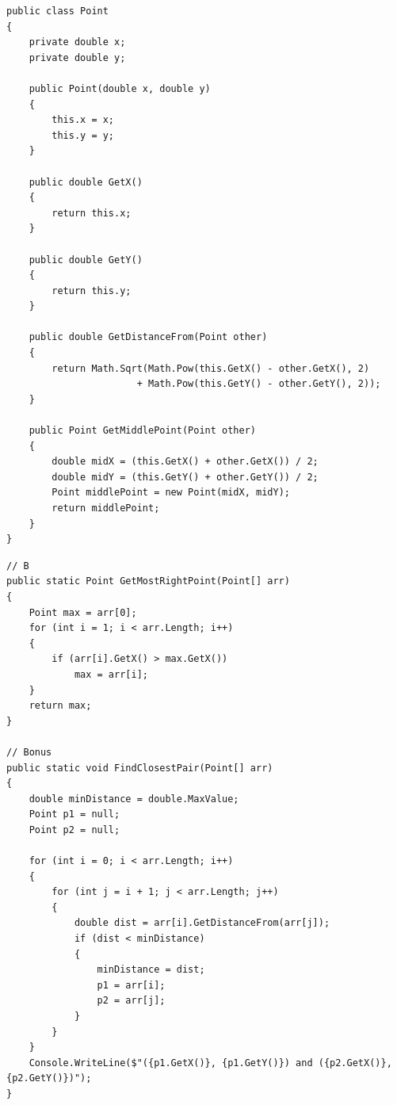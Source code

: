 \documentclass[14pt]{extarticle}
\begin{document}
\ifwithsols
{\small
\begin{boxSolution}[فرع أ]
\begin{english}
\begin{verbatim}
public class Point
{
    private double x;
    private double y;

    public Point(double x, double y)
    {
        this.x = x;
        this.y = y;
    }

    public double GetX()
    {
        return this.x;
    }

    public double GetY()
    {
        return this.y;
    }

    public double GetDistanceFrom(Point other)
    {
        return Math.Sqrt(Math.Pow(this.GetX() - other.GetX(), 2)
                       + Math.Pow(this.GetY() - other.GetY(), 2));
    }

    public Point GetMiddlePoint(Point other)
    {
        double midX = (this.GetX() + other.GetX()) / 2;
        double midY = (this.GetY() + other.GetY()) / 2;
        Point middlePoint = new Point(midX, midY);
        return middlePoint;
    }
}
\end{verbatim}
\end{english}
\end{boxSolution}

\begin{boxSolution}[فرع ب + ج]
\begin{english}
\begin{verbatim}
// B
public static Point GetMostRightPoint(Point[] arr)
{
    Point max = arr[0];
    for (int i = 1; i < arr.Length; i++)
    {
        if (arr[i].GetX() > max.GetX())
            max = arr[i];
    }
    return max;
}

// Bonus
public static void FindClosestPair(Point[] arr)
{
    double minDistance = double.MaxValue;
    Point p1 = null;
    Point p2 = null;

    for (int i = 0; i < arr.Length; i++)
    {
        for (int j = i + 1; j < arr.Length; j++)
        {
            double dist = arr[i].GetDistanceFrom(arr[j]);
            if (dist < minDistance)
            {
                minDistance = dist;
                p1 = arr[i];
                p2 = arr[j];
            }
        }
    }
    Console.WriteLine($"({p1.GetX()}, {p1.GetY()}) and ({p2.GetX()}, {p2.GetY()})");
}
\end{verbatim}
\end{english}
\end{boxSolution}
}
\fi
\end{document}
